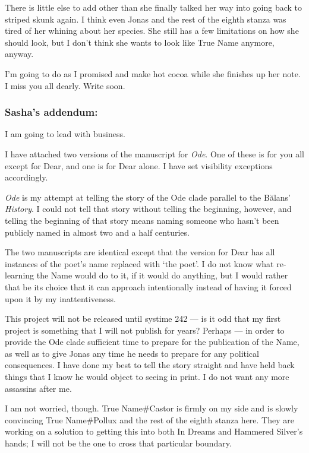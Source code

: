 There is little else to add other than she finally talked her way into going back to striped skunk again. I think even Jonas and the rest of the eighth stanza was tired of her whining about her species. She still has a few limitations on how she should look, but I don't think she wants to look like True Name anymore, anyway.

I'm going to do as I promised and make hot cocoa while she finishes up her note. I miss you all dearly. Write soon.

\hypertarget{sashas-addendum}{%
\subsubsection{Sasha's addendum:}\label{sashas-addendum}}

I am going to lead with business.

I have attached two versions of the manuscript for \emph{Ode}. One of these is for you all except for Dear, and one is for Dear alone. I have set visibility exceptions accordingly.

\emph{Ode} is my attempt at telling the story of the Ode clade parallel to the Bălans' \emph{History}. I could not tell that story without telling the beginning, however, and telling the beginning of that story means naming someone who hasn't been publicly named in almost two and a half centuries.

The two manuscripts are identical except that the version for Dear has all instances of the poet's name replaced with `the poet'. I do not know what re-learning the Name would do to it, if it would do anything, but I would rather that be its choice that it can approach intentionally instead of having it forced upon it by my inattentiveness.

This project will not be released until systime 242 — is it odd that my first project is something that I will not publish for years? Perhaps — in order to provide the Ode clade sufficient time to prepare for the publication of the Name, as well as to give Jonas any time he needs to prepare for any political consequences. I have done my best to tell the story straight and have held back things that I know he would object to seeing in print. I do not want any more assassins after me.

I am not worried, though. True Name\#Castor is firmly on my side and is slowly convincing True Name\#Pollux and the rest of the eighth stanza here. They are working on a solution to getting this into both In Dreams and Hammered Silver's hands; I will not be the one to cross that particular boundary.


